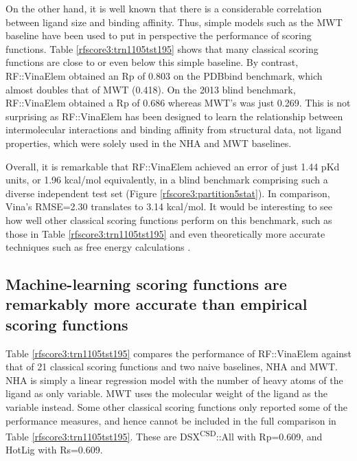 On the other hand, it is well known that there is a considerable correlation between ligand size and binding affinity. Thus, simple models such as the MWT baseline have been used to put in perspective the performance of scoring functions. Table \ref{rfscore3:trn1105tst195} shows that many classical scoring functions are close to or even below this simple baseline. By contrast, RF::VinaElem obtained an Rp of 0.803 on the PDBbind benchmark, which almost doubles that of MWT (0.418). On the 2013 blind benchmark, RF::VinaElem obtained a Rp of 0.686 whereas MWT's was just 0.269. This is not surprising as RF::VinaElem has been designed to learn the relationship between intermolecular interactions and binding affinity from structural data, not ligand properties, which were solely used in the NHA and MWT baselines.

Overall, it is remarkable that RF::VinaElem achieved an error of just 1.44 pKd units, or 1.96 kcal/mol equivalently, in a blind benchmark comprising such a diverse independent test set (Figure \ref{rfscore3:partition5stat}). In comparison, Vina's RMSE=2.30 translates to 3.14 kcal/mol. It would be interesting to see how well other classical scoring functions perform on this benchmark, such as those in Table \ref{rfscore3:trn1105tst195} and even theoretically more accurate techniques such as free energy calculations \citep{578}.

\subsection{Machine-learning scoring functions are remarkably more accurate than empirical scoring functions}

Table \ref{rfscore3:trn1105tst195} compares the performance of RF::VinaElem against that of 21 classical scoring functions and two naive baselines, NHA and MWT. NHA is simply a linear regression model with the number of heavy atoms of the ligand as only variable. MWT uses the molecular weight of the ligand as the variable instead. Some other classical scoring functions only reported some of the performance measures, and hence cannot be included in the full comparison in Table \ref{rfscore3:trn1105tst195}. These are DSX\textsuperscript{CSD}::All \citep{1460} with Rp=0.609, and HotLig \citep{1459} with Rs=0.609.

